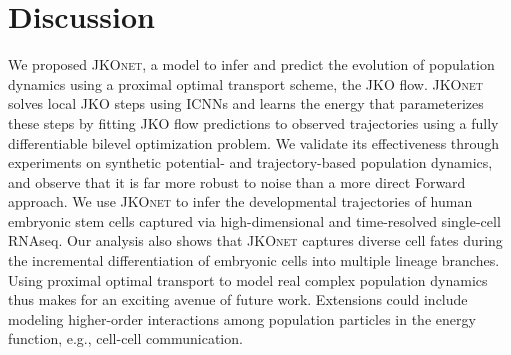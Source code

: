 \section{Discussion}
We proposed \textsc{JKOnet}, a model to infer and predict the evolution of population dynamics using a proximal optimal transport scheme, the JKO flow.
\textsc{JKOnet} solves local JKO steps using ICNNs and learns the energy that parameterizes these steps by fitting JKO flow predictions to observed trajectories using a fully differentiable bilevel optimization problem.
We validate its effectiveness through experiments on synthetic potential- and trajectory-based population dynamics, and observe that it is far more robust to noise than a more direct Forward approach. We use \textsc{JKOnet} to infer the developmental trajectories of human embryonic stem cells captured via high-dimensional and time-resolved single-cell RNAseq. 
Our analysis also shows that \textsc{JKOnet} captures diverse cell fates during the incremental differentiation of embryonic cells into multiple lineage branches.
Using proximal optimal transport to model real complex population dynamics thus makes for an exciting avenue of future work. Extensions could include modeling higher-order interactions among population particles in the energy function, e.g., cell-cell communication.
